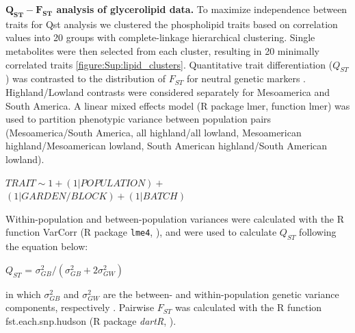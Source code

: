 \documentclass[9pt,twocolumn,twoside,lineno]{biorxiv}
\begin{document}
\textbf{$\mathbf{Q_{ST}-F_{ST}}$ analysis of glycerolipid data.}
To maximize independence between traits for Qst analysis we clustered the phospholipid traits based on correlation values into 20 groups with complete-linkage hierarchical clustering. Single metabolites were then selected from each cluster, resulting in 20 minimally correlated traits \cref{figure:Sup:lipid_clusters}. Quantitative trait differentiation ($Q_{ST}$) was contrasted to the distribution of $F_{ST}$ for neutral genetic markers \cite{whitlock2008evolutionary}. 
Highland/Lowland contrasts were considered separately for Mesoamerica and South America.
A linear mixed effects model (R package lmer, function lmer) was used to partition phenotypic variance between population pairs (Mesoamerica/South America, all highland/all lowland, Mesoamerican highland/Mesoamerican lowland, South American highland/South American lowland).
\begin{center}
${ TRAIT \sim 1 + (1|POPULATION) + }$\\
${(1|GARDEN/BLOCK) + (1|BATCH)}$
\end{center}
Within-population and between-population variances were calculated with the R function VarCorr (R package \texttt{lme4}, \citealp{bates2014lme4}), and were used to calculate $Q_{ST}$ following the equation below:
\begin{center}
$Q_{ST}$ = \(\sigma^{2}_{GB}/(\sigma^{2}_{GB}+2\sigma^{2}_{GW})\)
\end{center}
\noindent in which $\sigma^{2}_{GB}$ and $\sigma^{2}_{GW}$ are the between- and within-population genetic variance components, respectively \cite{Leinonen2013-ic}.
Pairwise $F_{ST}$ was calculated with the R function fst.each.snp.hudson (R package \textit{dartR}, \citealp{gruber2018dartr}).
\end{document}

